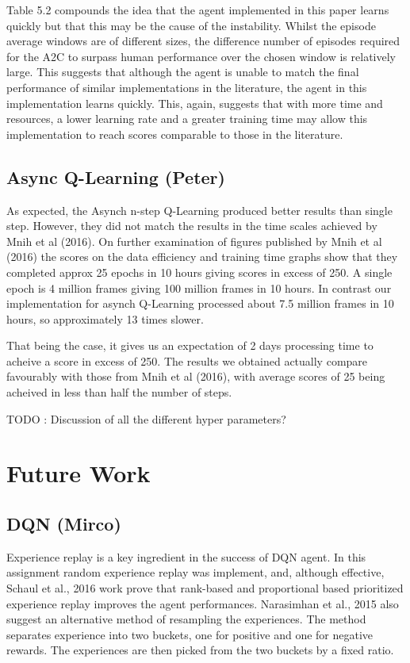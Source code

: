 \documentclass{article}
\begin{document}
Table 5.2 compounds the idea that the agent implemented in this paper learns quickly but that this may be the cause of the instability. Whilst the episode average windows are of different sizes, the difference number of episodes required for the A2C to surpass human performance over the chosen window is relatively large. This suggests that although the agent is unable to match the final performance of similar implementations in the literature, the agent in this implementation learns quickly. This, again, suggests that with more time and resources, a lower learning rate and a greater training time may allow this implementation to reach scores comparable to those in the literature.

\subsection{Async Q-Learning (Peter)}

As expected, the Asynch n-step Q-Learning produced better results than single step. However, they did not match the results in the time scales achieved by Mnih et al (2016). On further examination of figures published by Mnih et al (2016) the scores on the data efficiency and training time graphs show that they completed approx 25 epochs in 10 hours giving scores in excess of 250. A single epoch is 4 million frames giving 100 million frames in 10 hours. In contrast our implementation for asynch Q-Learning processed about 7.5 million frames in 10 hours, so approximately 13 times slower. 

That being the case, it gives us an expectation of 2 days processing time to acheive a score in excess of 250. The results we obtained actually compare favourably with those from Mnih et al (2016), with average scores of 25 being acheived in less than half the number of steps.

TODO : Discussion of all the different hyper parameters?

\section{Future Work}

\subsection{DQN (Mirco)}
Experience replay is a key ingredient in the success of DQN agent. In this assignment random experience replay was implement, and, although effective, Schaul et al., 2016 work prove that rank-based and proportional based prioritized experience replay improves the agent performances. Narasimhan et al., 2015 also suggest an alternative method of resampling the experiences. The method separates experience into two buckets, one for positive and one for negative rewards. The experiences are then picked from the two buckets by a fixed ratio.
\end{document}
